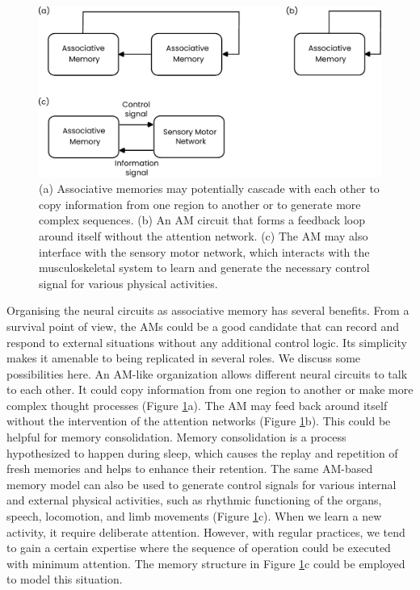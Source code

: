 \documentclass[reprint,amsmath,amssymb,apr,aip,onecolumn, 11pt]{revtex4-1}
\begin{document}
\begin{figure}[h!]
	\centerline{\includegraphics[width=1\linewidth]{figures/figure_model_generalization.pdf}}
	\caption{(a) Associative memories may potentially cascade with each other to copy information from one region to another or to generate more complex sequences. (b) An AM circuit that forms a feedback loop around itself without the attention network. (c) The AM may also interface with the sensory motor network, which interacts with the musculoskeletal system to learn and generate the necessary control signal for various physical activities. }
	\label{fig:model_generalization}
\end{figure}

Organising the neural circuits as associative memory has several benefits. From a survival point of view, the AMs could be a good candidate that can record and respond to external situations without any additional control logic. Its simplicity makes it amenable to being replicated in several roles. We discuss some possibilities here. An AM-like organization allows different neural circuits to talk to each other. It could copy information from one region to another or make more complex thought processes (Figure \ref{fig:model_generalization}a). The AM may feed back around itself without the intervention of the attention networks (Figure \ref{fig:model_generalization}b). This could be helpful for memory consolidation. Memory consolidation is a process hypothesized to happen during sleep, which causes the replay and repetition of fresh memories and helps to enhance their retention\cite{Diekelmann_2010}.  The same AM-based memory model can also be used to generate control signals for various internal and external physical activities, such as rhythmic functioning of the organs, speech, locomotion, and limb movements (Figure \ref{fig:model_generalization}c). When we learn a new activity, it require deliberate attention. However, with regular practices, we tend to gain a certain expertise where the sequence of operation could be executed with  minimum attention. The memory structure in Figure \ref{fig:model_generalization}c could be employed to model this situation. 
\end{document}
